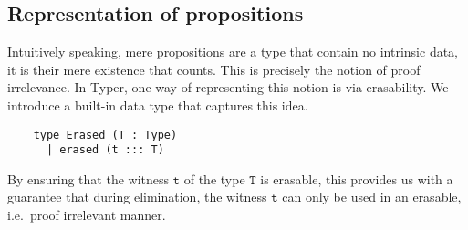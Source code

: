 \documentclass[12pt,twoside,maitrise]{dms}
\theoremstyle{definition}
\numberwithin{equation}{section}
\numberwithin{table}{chapter}
\numberwithin{figure}{chapter}
\newcommand\id[1] {\texttt{#1}}
\begin{document}
\subsection*{Representation of propositions}\label{subsec:mere-propositions}

Intuitively speaking, mere propositions are a type that contain no intrinsic
data, it is their mere existence that counts. This is precisely the notion of
proof irrelevance. In Typer, one way of representing this notion is via
erasability. We introduce a built-in data type that captures this idea.

\begin{verbatim}
    type Erased (T : Type)
      | erased (t ::: T)
\end{verbatim}

By ensuring that the witness $\id{t}$ of the type $\id{T}$ is erasable, this
provides us with a guarantee that during elimination, the witness $\id{t}$ can
only be used in an erasable, i.e.\ proof irrelevant manner.





\end{document}
